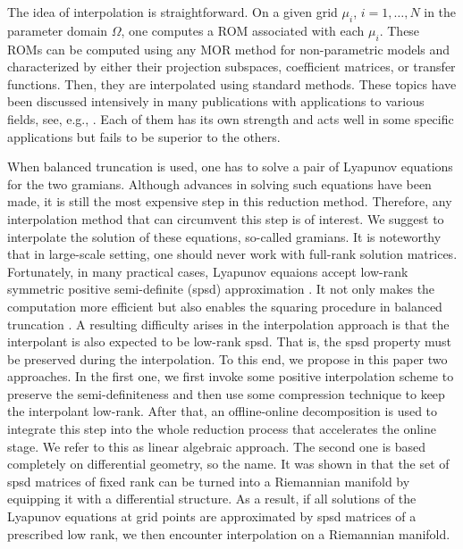 The idea of interpolation is straightforward. On a given grid $\mu_i$, $i = 1, \dots, N$ in the parameter domain $\Omega$, one computes a ROM associated with each $\mu_i$. These ROMs can be computed using any MOR method for non-parametric models \cite{Anto05} and characterized by either their  projection subspaces, coefficient matrices, or transfer functions. Then, they are interpolated using standard methods. These topics have been discussed intensively in many publications with applications to various fields, see, e.g., \cite{AmsaF08,BaurB09,PanzMEL10,DegrVW10,AmsaF11,Son12,SonS15}. Each of them has its own strength and acts well in some specific applications but fails to be superior to the others. 

When balanced truncation \cite{Moor81} is used,  one has to solve a pair of Lyapunov equations for the two gramians. Although advances in solving such equations have been made, it is still the most expensive step in this reduction method. Therefore, any interpolation method that can circumvent this step is of interest. We suggest to interpolate the solution of these equations, so-called gramians. It is noteworthy that in large-scale setting, one should never work with full-rank solution matrices. Fortunately, in many practical cases, Lyapunov equaions accept low-rank symmetric positive semi-definite (spsd) approximation \cite{Penz00b,AntoSZ02}. It not only makes the computation more efficient but also enables the squaring procedure in balanced truncation \cite{TombP87}. A resulting difficulty arises in the interpolation approach is that the interpolant is also expected to be low-rank spsd. That is, the spsd property must be preserved during the interpolation. To this end, we propose in this paper two approaches. In the first one, we first invoke some positive interpolation scheme to preserve the semi-definiteness and then use some compression technique to keep the interpolant low-rank. After that, an offline-online decomposition is used to integrate this step into the whole reduction process that accelerates the online stage. We refer to this as linear algebraic approach. The second one is based completely on differential geometry, so the name. It was shown in \cite{VandAV09,MassA18} that the set of spsd matrices of fixed rank can be turned into a Riemannian manifold by equipping it with a differential structure. As a result, if all solutions of the Lyapunov equations at grid points are approximated by spsd matrices of a prescribed low rank, we then encounter interpolation on a Riemannian manifold. 

